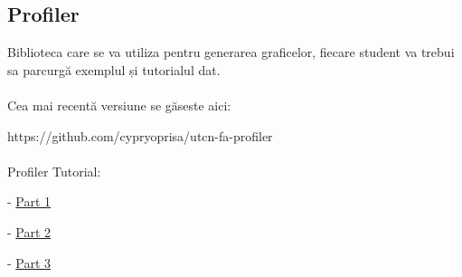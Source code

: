 \documentclass[../en-fa-lab.tex]{subfiles}
\begin{document}
\subsection{\texorpdfstring{\textbf{Profiler}}{Profiler}}\label{profiler}
Biblioteca care se va utiliza pentru generarea graficelor, fiecare student va trebui sa parcurgă exemplul și tutorialul dat.
\\\\
Cea mai recentă versiune se găseste aici: 

https://github.com/cypryoprisa/utcn-fa-profiler
\\\\
Profiler Tutorial:

- \href{https://youtu.be/iE4FFwdncDk}{Part 1}

- \href{https://youtu.be/vMhwBXEelSA}{Part 2}

- \href{https://youtu.be/ZOztj7aPWs4}{Part 3}
\end{document}
